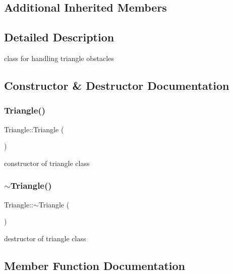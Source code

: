 \subsection*{Additional Inherited Members}


\subsection{Detailed Description}
class for handling triangle obstacles 

\subsection{Constructor \& Destructor Documentation}
\mbox{\label{class_triangle_aaefe4ed500c07918d30c6f0e286332c5}} 
\subsubsection{\texorpdfstring{Triangle()}{Triangle()}}
{\footnotesize\ttfamily Triangle\+::\+Triangle (\begin{DoxyParamCaption}{ }\end{DoxyParamCaption})}

constructor of triangle class \mbox{\label{class_triangle_a5199760a17454f4dc94c855a57e3a152}} 
\subsubsection{\texorpdfstring{$\sim$\+Triangle()}{~Triangle()}}
{\footnotesize\ttfamily Triangle\+::$\sim$\+Triangle (\begin{DoxyParamCaption}{ }\end{DoxyParamCaption})}

destructor of triangle class 

\subsection{Member Function Documentation}
\mbox{\label{class_triangle_a0c77555fd0e47f1344c23fa880f43777}} 
